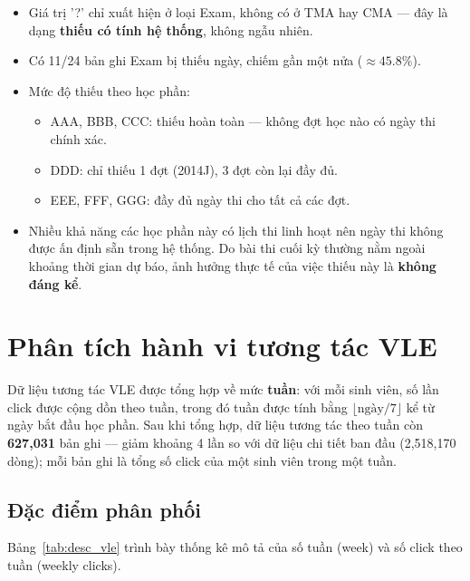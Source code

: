 \documentclass[a4paper]{article}
\newcommand{\code}[1]{{\ttfamily\def\_{\textunderscore\discretionary{}{}{}}#1}}
\def\code#1{#1}%
\def\_{ }%
\begin{document}
\begin{itemize}[leftmargin=*]
  \item Giá trị \code{'?'} chỉ xuất hiện ở loại Exam, không có ở TMA hay CMA ---
        đây là dạng \textbf{thiếu có tính hệ thống}, không ngẫu nhiên.
  \item Có 11/24 bản ghi Exam bị thiếu ngày, chiếm gần một nửa
        ($\approx 45.8\%$).
  \item Mức độ thiếu theo học phần:
    \begin{itemize}
      \item AAA, BBB, CCC: thiếu hoàn toàn --- không đợt học nào có ngày thi
            chính xác.
      \item DDD: chỉ thiếu 1 đợt (2014J), 3 đợt còn lại đầy đủ.
      \item EEE, FFF, GGG: đầy đủ ngày thi cho tất cả các đợt.
    \end{itemize}
  \item Nhiều khả năng các học phần này có lịch thi linh hoạt nên ngày thi
        không được ấn định sẵn trong hệ thống. Do bài thi cuối kỳ thường nằm
        ngoài khoảng thời gian dự báo, ảnh hưởng thực tế của việc thiếu này là
        \textbf{không đáng kể}.
\end{itemize}

\section{Phân tích hành vi tương tác VLE}

Dữ liệu tương tác VLE được tổng hợp về mức \textbf{tuần}: với mỗi sinh viên, số
lần click được cộng dồn theo tuần, trong đó tuần được tính bằng
$\lfloor \text{ngày}/7 \rfloor$ kể từ ngày bắt đầu học phần. Sau khi tổng hợp,
dữ liệu tương tác theo tuần còn \textbf{627{,}031} bản ghi --- giảm khoảng 4 lần
so với dữ liệu chi tiết ban đầu (2{,}518{,}170 dòng); mỗi bản ghi là tổng số
click của một sinh viên trong một tuần.

\subsection{Đặc điểm phân phối}

Bảng~\ref{tab:desc_vle} trình bày thống kê mô tả của số tuần (\code{week}) và số
click theo tuần (\code{weekly\_clicks}).


\end{document}
